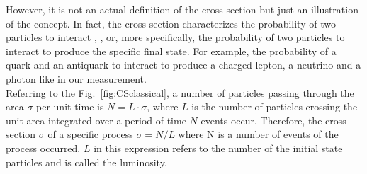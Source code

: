 However, it is not an actual definition of the cross section but just an illustration of the concept. In fact, the cross section characterizes the probability of two particles to interact \cite{ref_Griffiths}, \cite{ref_Halzen_Martin}, \cite{ref_CS_wiki} or, more specifically, the probability of two particles to interact to produce the specific final state. For example, the probability of a quark and an antiquark to interact to produce a charged lepton, a neutrino and a photon like in our measurement.\\

Referring to the Fig.~\ref{fig:CSclassical}, a number of particles passing through the area $\sigma$ per unit time is $N=L \cdot \sigma$, where $L$ is the number of particles crossing the unit area integrated over a period of time $N$ events occur. Therefore, the cross section $\sigma$ of a specific process $\sigma=N/L$ where N is a number of events of the process occurred. $L$ in this expression refers to the number of the initial state particles and is called the luminosity. \\
  


